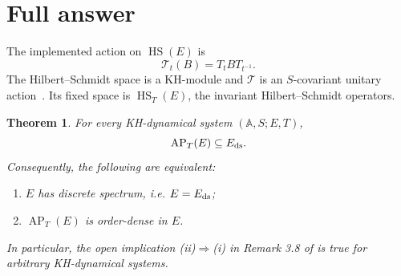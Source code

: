 \documentclass[11pt]{article}
\newtheorem{theorem}{Theorem}
\newcommand{\A}{\mathbb A}
\newcommand{\HS}{\operatorname{HS}}
\newcommand{\AP}{\operatorname{AP}}
\begin{document}
\section{Full answer}

The implemented action on $\HS(E)$ is
\[
 \mathcal T_t(B)=T_tBT_{t^{-1}}.
\]
The Hilbert--Schmidt space is a KH-module and $\mathcal T$ is an
$S$-covariant unitary action~\cite[Secs. 5--6]{EHK}.  Its fixed space is
$\HS_T(E)$, the invariant Hilbert--Schmidt operators.

\begin{theorem}\label{thm:main}
For every KH-dynamical system $(\A,S;E,T)$,
\[
 \AP_T(E)\subseteq E_{\rm ds}.
\]
Consequently, the following are equivalent:
\begin{enumerate}
\item $E$ has discrete spectrum, i.e. $E=E_{\rm ds}$;
\item $\AP_T(E)$ is order-dense in $E$.
\end{enumerate}
In particular, the open implication (ii)$\Rightarrow$(i) in Remark 3.8 of
\cite{HK} is true for arbitrary KH-dynamical systems.
\end{theorem}
\end{document}
